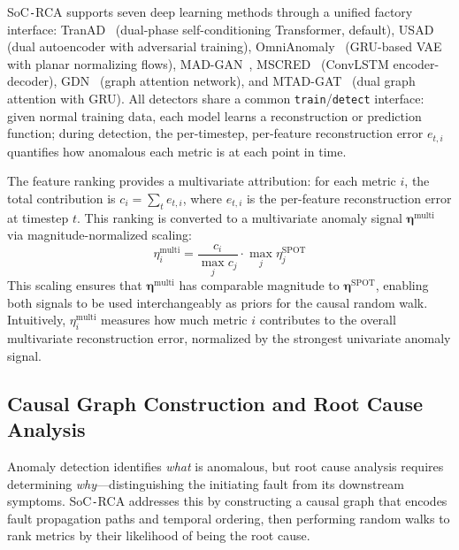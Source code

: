 \documentclass[a4paper,fleqn]{cas-dc}
\newcommand{\sysname}{SoC\texttt{-}RCA}
\begin{document}
\sysname{} supports seven deep learning methods through a unified factory interface: TranAD~\cite{DBLP:journals/pvldb/TuliCJ22} (dual-phase self-conditioning Transformer, default), USAD~\cite{10.1145/3394486.3403392} (dual autoencoder with adversarial training), OmniAnomaly~\cite{10.1145/3292500.3330672} (GRU-based VAE with planar normalizing flows), MAD-GAN~\cite{10.1007/978-3-030-30490-4_56}, MSCRED~\cite{10.1609/aaai.v33i01.33011409} (ConvLSTM encoder-decoder), GDN~\cite{deng2021graph} (graph attention network), and MTAD-GAT~\cite{10.1109/ICDM50108.2020.00093} (dual graph attention with GRU).  All detectors share a common \texttt{train}/\texttt{detect} interface: given normal training data, each model learns a reconstruction or prediction function; during detection, the per-timestep, per-feature reconstruction error $e_{t,i}$ quantifies how anomalous each metric is at each point in time.

The feature ranking provides a multivariate attribution: for each metric $i$, the total contribution is $c_i = \sum_{t} e_{t,i}$, where $e_{t,i}$ is the per-feature reconstruction error at timestep $t$.  This ranking is converted to a multivariate anomaly signal $\boldsymbol{\eta}^{\text{multi}}$ via magnitude-normalized scaling:
\begin{equation}
  \eta^{\text{multi}}_i = \frac{c_i}{\max_j c_j} \cdot \max_j \eta^{\text{SPOT}}_j
  \label{eq:multi_eta}
\end{equation}
This scaling ensures that $\boldsymbol{\eta}^{\text{multi}}$ has comparable magnitude to $\boldsymbol{\eta}^{\text{SPOT}}$, enabling both signals to be used interchangeably as priors for the causal random walk.  Intuitively, $\eta^{\text{multi}}_i$ measures how much metric $i$ contributes to the overall multivariate reconstruction error, normalized by the strongest univariate anomaly signal.


\subsection{Causal Graph Construction and Root Cause Analysis}
\label{sec:dual_rca}

Anomaly detection identifies \emph{what} is anomalous, but root cause analysis requires determining \emph{why}---distinguishing the initiating fault from its downstream symptoms.  \sysname{} addresses this by constructing a causal graph that encodes fault propagation paths and temporal ordering, then performing random walks to rank metrics by their likelihood of being the root cause.
\end{document}
